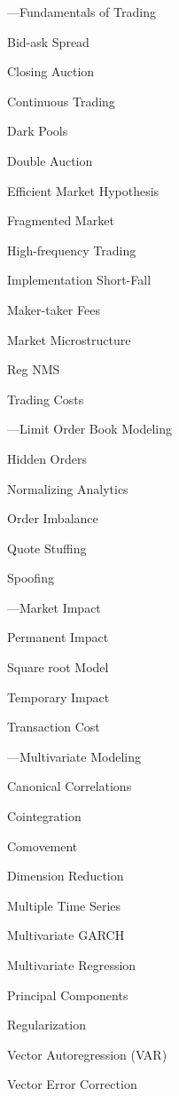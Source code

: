 %
\begin{minipage}{0.40\textwidth}
\noindent ---Fundamentals of Trading 
	\begin{flushright}
	Bid-ask Spread \par
	Closing Auction \par
	Continuous Trading \par
	Dark Pools \par
	Double Auction \par
	Efficient Market Hypothesis \par
	Fragmented Market \par
	High-frequency Trading \par
	Implementation Short-Fall \par
	Maker-taker Fees \par
	Market Microstructure \par
	Reg NMS \par
	Trading Costs
	\end{flushright}


\noindent ---Limit Order Book Modeling
	\begin{flushright}
	Hidden Orders \par
	Normalizing Analytics \par
	Order Imbalance \par
	Quote Stuffing \par
	Spoofing
	\end{flushright}


\noindent ---Market Impact
	\begin{flushright}
	Permanent Impact \par
	Square root Model \par
	Temporary Impact \par
	Transaction Cost
	\end{flushright}


\noindent ---Multivariate Modeling
	\begin{flushright}
	Canonical Correlations \par
	Cointegration \par
	Comovement \par
	Dimension Reduction \par
	Multiple Time Series \par
	Multivariate GARCH \par
	Multivariate Regression \par
	Principal Components \par
	Regularization \par
	Vector Autoregression (VAR) \par
	Vector Error Correction
	\end{flushright}

\vfill
\end{minipage} \newpage

